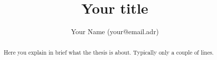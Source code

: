 \documentclass[11pt]{report}
\title{Your title}
\author{Your Name (your@email.adr)}
\begin{document}


\maketitle

\begin{abstract}
Here you explain in brief what the thesis is about. Typically only a
couple of lines.
\end{abstract}

\small
\setcounter{secnumdepth}{-1}

\setcounter{secnumdepth}{3}
\tableofcontents
\listoffigures
\listoftables
\normalsize
\newpage

\setcounter{secnumdepth}{-1}

\setcounter{secnumdepth}{3}





\appendix



\end{document}
